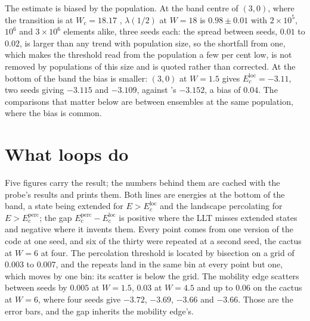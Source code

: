 The estimate is biased by the population. At the band centre of $(3,0)$,
where the transition is at $W_{c}=18.17$ \citep{tikhonov2019,parisi2019},
$\lambda(1/2)$ at $W=18$ is $0.98\pm0.01$ with $2\times10^{5}$, $10^{6}$ and $3\times10^{6}$ elements alike, three seeds each: the spread between seeds, $0.01$ to $0.02$, is larger than any trend with population size, so the shortfall from one, which makes the threshold read from the population a few per cent low, is not removed by populations of this size and is quoted rather than corrected. At the bottom of the band the
bias is smaller: $(3,0)$ at $W=1.5$ gives $E_{c}^{\mathrm{loc}}=-3.11$, two seeds giving $-3.115$ and $-3.109$, against \citeauthor{tonetti2026}'s $-3.152$, a bias of $0.04$. The comparisons that matter
below are between ensembles at the same population, where the bias is
common.

\section{What loops do}
\label{sec:loops}

Five figures carry the result; the numbers behind them are cached with
the probe's results and 
prints them. Both lines are energies at the
bottom of the band, a state being extended for $E>E_{c}^{\mathrm{loc}}$ and
the landscape percolating for $E>E_{c}^{\mathrm{perc}}$; the gap
$E_{c}^{\mathrm{perc}}-E_{c}^{\mathrm{loc}}$ is positive where the LLT misses
extended states and negative where it invents them. Every point comes from one version of the code at one seed, and six of the thirty were repeated at a second seed, the cactus at $W=6$ at four. The percolation threshold is located by bisection on a grid of $0.003$ to $0.007$, and the repeats land in the same bin at every point but one, which moves by one bin: its scatter is below the grid. The mobility edge scatters between seeds by $0.005$ at $W=1.5$, $0.03$ at $W=4.5$ and up to $0.06$ on the cactus at $W=6$, where four seeds give $-3.72$, $-3.69$, $-3.66$ and $-3.66$. Those are the error bars, and the gap inherits the mobility edge's.

